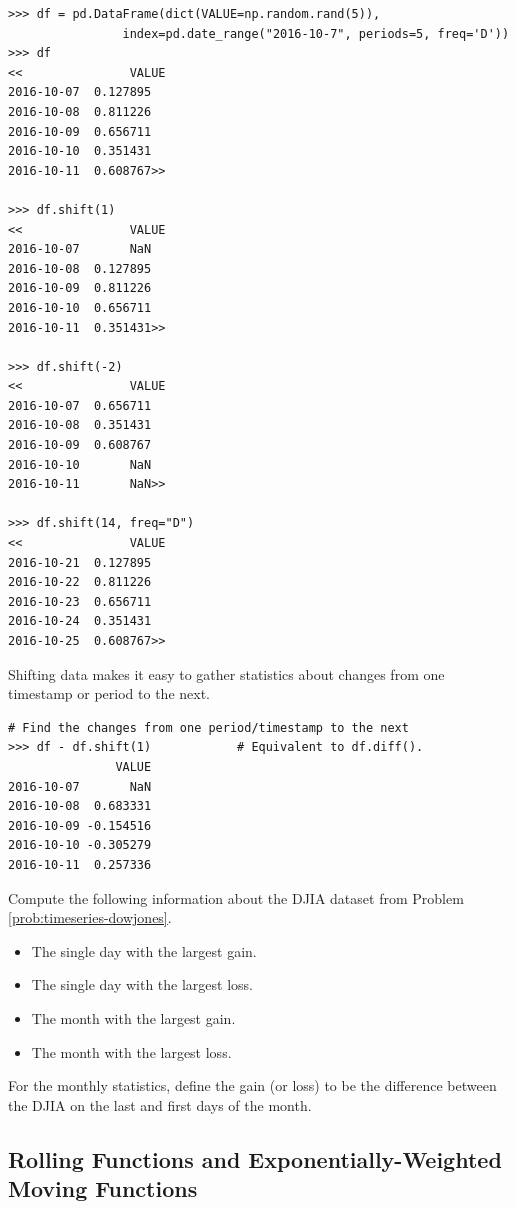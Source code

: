 \begin{lstlisting}
>>> df = pd.DataFrame(dict(VALUE=np.random.rand(5)),
                index=pd.date_range("2016-10-7", periods=5, freq='D'))
>>> df
<<               VALUE
2016-10-07  0.127895
2016-10-08  0.811226
2016-10-09  0.656711
2016-10-10  0.351431
2016-10-11  0.608767>>

>>> df.shift(1)
<<               VALUE
2016-10-07       NaN
2016-10-08  0.127895
2016-10-09  0.811226
2016-10-10  0.656711
2016-10-11  0.351431>>

>>> df.shift(-2)
<<               VALUE
2016-10-07  0.656711
2016-10-08  0.351431
2016-10-09  0.608767
2016-10-10       NaN
2016-10-11       NaN>>

>>> df.shift(14, freq="D")
<<               VALUE
2016-10-21  0.127895
2016-10-22  0.811226
2016-10-23  0.656711
2016-10-24  0.351431
2016-10-25  0.608767>>
\end{lstlisting}

Shifting data makes it easy to gather statistics about changes from one timestamp or period to the next.

\begin{lstlisting}
# Find the changes from one period/timestamp to the next
>>> df - df.shift(1)            # Equivalent to df.diff().
               VALUE
2016-10-07       NaN
2016-10-08  0.683331
2016-10-09 -0.154516
2016-10-10 -0.305279
2016-10-11  0.257336
\end{lstlisting}

\begin{problem}
Compute the following information about the DJIA dataset from Problem \ref{prob:timeseries-dowjones}.
\begin{itemize}
    \item The single day with the largest gain.
    \item The single day with the largest loss.
    \item The month with the largest gain.
    \item The month with the largest loss.
\end{itemize}
For the monthly statistics, define the gain (or loss) to be the difference between the DJIA on the last and first days of the month.
\end{problem}

\subsection*{Rolling Functions and Exponentially-Weighted Moving Functions}

